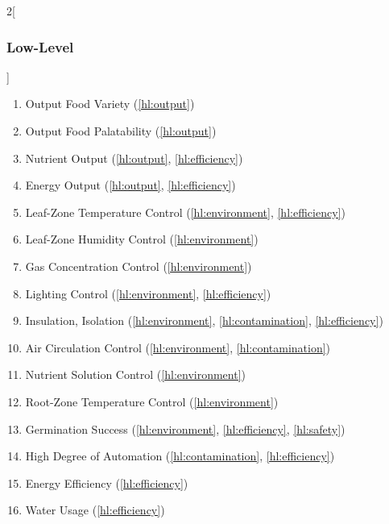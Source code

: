 \documentclass{report}
\begin{document}
\begin{multicols}{2}[\subsubsection{Low-Level}\label{sec:llos}]
    \begin{enumerate}[label=LL\arabic*., ref=LL\arabic*]
        \item \label{ll:output_variety} Output Food Variety \hfill (\ref{hl:output})
        \item \label{ll:output_palatability} Output Food Palatability \hfill (\ref{hl:output})
        \item \label{ll:output_nutrients} Nutrient Output \hfill (\ref{hl:output}, \ref{hl:efficiency})
        \item \label{ll:output_energy} Energy Output \hfill (\ref{hl:output}, \ref{hl:efficiency})
        \item \label{ll:control_airtemp} Leaf-Zone Temperature Control \hfill (\ref{hl:environment}, \ref{hl:efficiency})
        \item \label{ll:control_airhum} Leaf-Zone Humidity Control \hfill (\ref{hl:environment})
        \item \label{ll:control_gas} Gas Concentration Control \hfill (\ref{hl:environment})
        \item \label{ll:control_light} Lighting Control \hfill (\ref{hl:environment}, \ref{hl:efficiency})
        \item \label{ll:insulateisolate} Insulation, Isolation \hfill (\ref{hl:environment}, \ref{hl:contamination}, \ref{hl:efficiency})
        \item \label{ll:control_aircirculation} Air Circulation Control \hfill (\ref{hl:environment}, \ref{hl:contamination})
        \item \label{ll:control_nutrientsolution} Nutrient Solution Control \hfill (\ref{hl:environment})
        \item \label{ll:control_roottemp} Root-Zone Temperature Control \hfill (\ref{hl:environment})
        \item \label{ll:germinationsuccess} Germination Success \hfill (\ref{hl:environment}, \ref{hl:efficiency}, \ref{hl:safety})
        \item \label{ll:automation} High Degree of Automation \hfill (\ref{hl:contamination}, \ref{hl:efficiency})
        \item \label{ll:efficiency_energy} Energy Efficiency \hfill (\ref{hl:efficiency})
        \item \label{ll:efficiency_water} Water Usage \hfill (\ref{hl:efficiency})

\end{enumerate}
\end{multicols}
\end{document}
